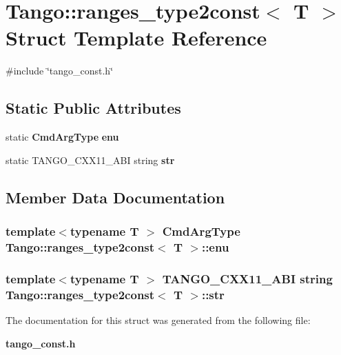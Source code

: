 \section{Tango\-:\-:ranges\-\_\-type2const$<$ T $>$ Struct Template Reference}
\label{structTango_1_1ranges__type2const}


{\ttfamily \#include \char`\"{}tango\-\_\-const.\-h\char`\"{}}

\subsection*{Static Public Attributes}
\begin{DoxyCompactItemize}
\item 
static {\bf Cmd\-Arg\-Type} {\bf enu}
\item 
static T\-A\-N\-G\-O\-\_\-\-C\-X\-X11\-\_\-\-A\-B\-I string {\bf str}
\end{DoxyCompactItemize}


\subsection{Member Data Documentation}
\subsubsection[{enu}]{\setlength{\rightskip}{0pt plus 5cm}template$<$typename T $>$ {\bf Cmd\-Arg\-Type} {\bf Tango\-::ranges\-\_\-type2const}$<$ T $>$\-::enu\hspace{0.3cm}{\ttfamily [static]}}\label{structTango_1_1ranges__type2const_a486a3799e86b071145452c6861a65f73}
\subsubsection[{str}]{\setlength{\rightskip}{0pt plus 5cm}template$<$typename T $>$ T\-A\-N\-G\-O\-\_\-\-C\-X\-X11\-\_\-\-A\-B\-I string {\bf Tango\-::ranges\-\_\-type2const}$<$ T $>$\-::str\hspace{0.3cm}{\ttfamily [static]}}\label{structTango_1_1ranges__type2const_aaddcd6d5edc9dea4db836223f3742bef}


The documentation for this struct was generated from the following file\-:\begin{DoxyCompactItemize}
\item 
{\bf tango\-\_\-const.\-h}\end{DoxyCompactItemize}
